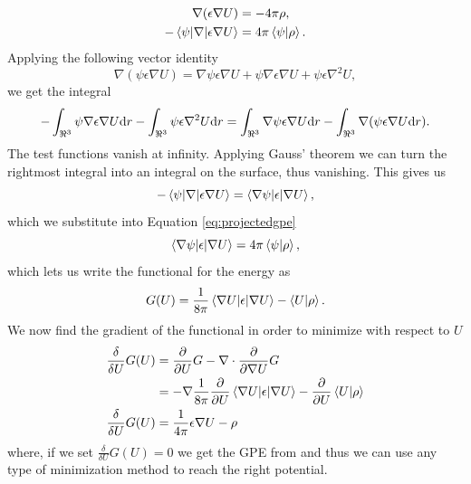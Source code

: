 \documentclass[../Thesis.tex]{subfiles}
\begin{document}
\begin{align}
  \begin{split}\label{eq:projectedgpe}
    \nabla (\epsilon\nabla U) &= -4\pi\rho,\\
    -\braket{\psi|\nabla |\epsilon\nabla U} &= 4\pi \braket{\psi|\rho}.
  \end{split}
\end{align}
Applying the following vector identity
\begin{equation}
\nabla (\psi \epsilon\nabla U)=\nabla \psi \epsilon \nabla U +  \psi \nabla \epsilon \nabla U +  \psi \epsilon\nabla^{2} U,
\end{equation}
we get the integral
\begin{equation}
  -\int_{\real^3}\psi \nabla \epsilon \nabla U\text{d}r - \int_{\real^3} \psi\epsilon \nabla^{2} U\text{d}r = \int_{\real^3} \nabla \psi \epsilon \nabla U\text{d}r - \int_{\real^3} \nabla (\psi \epsilon\nabla U\text{d}r).
\end{equation}
The test functions vanish at infinity. Applying Gauss' theorem \cite{Lipparini:2013} we can turn the rightmost integral into
an integral on the surface, thus vanishing. This gives us
\begin{equation}
  -\braket{\psi|\nabla|\epsilon\nabla U} = \braket{\nabla \psi |\epsilon | \nabla U},
\end{equation}
which we substitute into Equation \ref{eq:projectedgpe}
\begin{equation}
  \braket{\nabla \psi |\epsilon | \nabla U} =  4\pi \braket{\psi|\rho},
\end{equation}
which lets us write the functional for the energy as \cite{Lipparini:2010bg}
\begin{equation}
  G(U) = \frac{1}{8\pi}  \braket{\nabla U |\epsilon | \nabla U} - \braket{U|\rho}.
\end{equation}
We now find the gradient of the functional in order to minimize with respect to $U$
\begin{align}
  \begin{split}
    \frac{\delta}{\delta U}G(U) &=  \frac{\partial}{\partial U}G - \nabla \cdot \frac{\partial}{\partial \nabla U}G \\
    &= -\nabla \frac{1}{8\pi}\frac{\partial}{\partial U}\braket{\nabla U|\epsilon|\nabla U} - \frac{\partial}{\partial U}\braket{U|\rho} \\
    \frac{\delta}{\delta U}G(U) &= \frac{1}{4\pi}\epsilon\nabla U - \rho
  \end{split}
\end{align}
where, if we set $\frac{\delta}{\delta U}G(U) = 0$ we get the \ac{GPE} from \cite{FossoTande:2013ka}
and thus we can use any type of minimization method to reach the right potential.


\biblio
\end{document}
